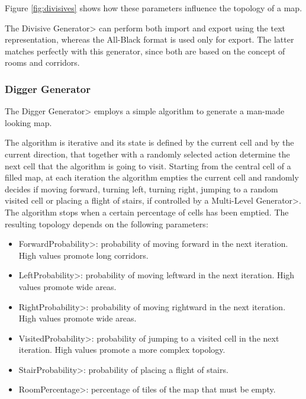 \noindent Figure \ref{fig:divisives} shows how these parameters influence the topology of a map.

\par

The \<Divisive Generator> can perform both import and export using the text representation, whereas the All-Black format is used only for export. The latter matches perfectly with this generator, since both are based on the concept of rooms and corridors.


\subsubsection{Digger Generator}

The \<Digger Generator> employs a simple algorithm to generate a man-made looking map.

\par

The algorithm is iterative and its state is defined by the current cell and by the current direction, that together with a randomly selected action determine the next cell that the algorithm is going to visit. Starting from the central cell of a filled map, at each iteration the algorithm empties the current cell and randomly decides if moving forward, turning left, turning right, jumping to a random visited cell or placing a flight of stairs, if controlled by a \<Multi-Level Generator>. The algorithm stops when a certain percentage of cells has been emptied. The resulting topology depends on the following parameters:

\begin{itemize}
\item \<ForwardProbability>: probability of moving forward in the next iteration. High values promote long corridors. 
\item \<LeftProbability>: probability of moving leftward in the next iteration. High values promote wide areas. 
\item \<RightProbability>: probability of moving rightward in the next iteration. High values promote wide areas. 
\item \<VisitedProbability>: probability of jumping to a visited cell in the next iteration. High values promote a more complex topology. 
\item \<StairProbability>: probability of placing a flight of stairs.
\item \<RoomPercentage>: percentage of tiles of the map that must be empty.
\end{itemize}

